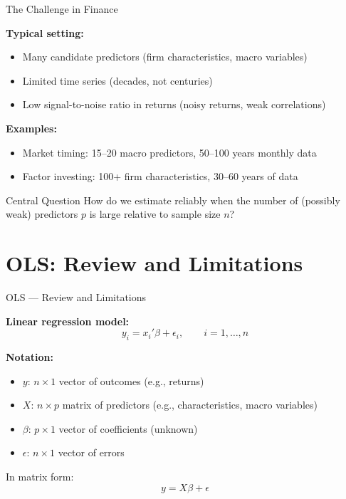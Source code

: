 \documentclass[10pt]{beamer}
\begin{document}
\begin{frame}{The Challenge in Finance}

\textbf{Typical setting:}
\begin{itemize}
  \item Many candidate predictors (firm characteristics, macro variables)
  \item Limited time series (decades, not centuries)
  \item Low signal-to-noise ratio in returns (noisy returns, weak correlations)
\end{itemize}

\vspace{1em}
\textbf{Examples:}
\begin{itemize}
  \item Market timing: 15--20 macro predictors, 50--100 years monthly data
  \item Factor investing: 100+ firm characteristics, 30--60 years of data
\end{itemize}

\vspace{1em}
\begin{block}{Central Question}
How do we estimate reliably when the number of (possibly weak) predictors $p$ is large relative to sample size $n$?
\end{block}

\end{frame}

\section{OLS: Review and Limitations}

\begin{frame}{OLS --- Review and Limitations}

\textbf{Linear regression model:}
\[
y_i = x_i'\beta + \epsilon_i, \qquad i = 1, \ldots, n
\]

\vspace{0.5em}
\textbf{Notation:}
\begin{itemize}
  \item $y$: $n \times 1$ vector of outcomes (e.g., returns)
  \item $X$: $n \times p$ matrix of predictors (e.g., characteristics, macro variables)
  \item $\beta$: $p \times 1$ vector of coefficients (unknown)
  \item $\epsilon$: $n \times 1$ vector of errors
\end{itemize}

\vspace{1em}
In matrix form:
\[
y = X\beta + \epsilon
\]

\end{frame}
    
\end{document}
